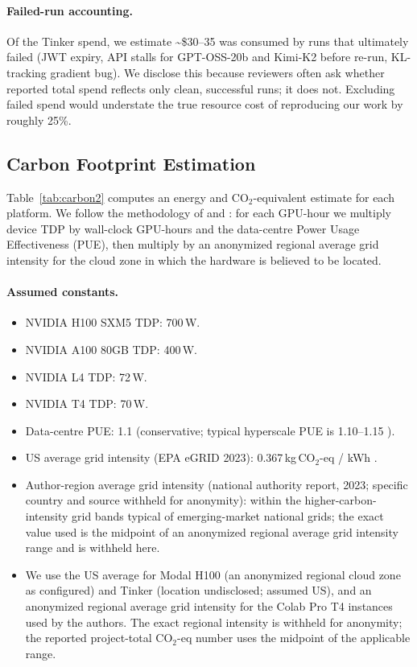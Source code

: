 \documentclass{article}
\begin{document}
\paragraph{Failed-run accounting.} Of the Tinker spend, we estimate
\textasciitilde\$30--35 was consumed by runs that ultimately failed
(JWT expiry, API stalls for GPT-OSS-20b and Kimi-K2 before re-run,
KL-tracking gradient bug). We disclose this because reviewers often ask
whether reported total spend reflects only clean, successful runs; it does
not. Excluding failed spend would understate the true resource cost of
reproducing our work by roughly 25\%.

\subsection{Carbon Footprint Estimation}
\label{sec:carbon}


Table~\ref{tab:carbon2} computes an energy and CO$_2$-equivalent estimate
for each platform. We follow the methodology of
\citet{patterson2024empirical} and \citet{strubell2019energy}: for each
GPU-hour we multiply device TDP by wall-clock GPU-hours and the data-centre
Power Usage Effectiveness (PUE), then multiply by an anonymized regional
average grid intensity for the cloud zone in which the hardware is
believed to be located.

\paragraph{Assumed constants.}
\begin{itemize}
  \item NVIDIA H100 SXM5 TDP: 700\,W.
  \item NVIDIA A100 80GB TDP: 400\,W.
  \item NVIDIA L4 TDP: 72\,W.
  \item NVIDIA T4 TDP: 70\,W.
  \item Data-centre PUE: 1.1 (conservative; typical hyperscale PUE is
        1.10--1.15 \cite{google2023pue, aws2023pue}).
  \item US average grid intensity (EPA eGRID 2023): 0.367\,kg\,CO$_2$-eq / kWh
        \cite{epa2023egrid}.
  \item Author-region average grid intensity (national authority report,
        2023; specific country and source withheld for anonymity):
        within the higher-carbon-intensity grid bands typical of
        emerging-market national grids; the exact value used is the
        midpoint of an anonymized regional average grid intensity range
        and is withheld here.
  \item We use the US average for Modal H100 (an anonymized regional
        cloud zone as configured) and Tinker (location undisclosed;
        assumed US), and an anonymized regional average grid intensity
        for the Colab Pro T4 instances used by the authors. The exact
        regional intensity is withheld for anonymity; the reported
        project-total CO$_2$-eq number uses the midpoint of the
        applicable range.
\end{itemize}
\end{document}
